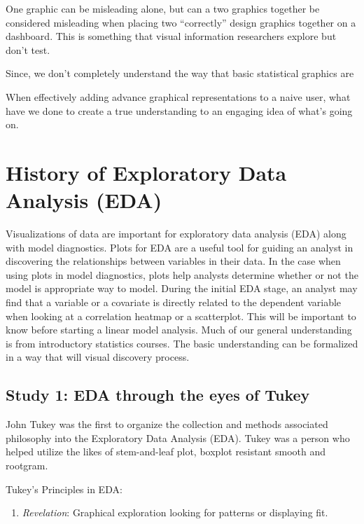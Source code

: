 \documentclass[print]{nuthesis}
\providecommand{\tightlist}{%
  \setlength{\itemsep}{0pt}\setlength{\parskip}{0pt}}
\begin{document}
One graphic can be misleading alone, but can a two graphics together be considered misleading when placing two ``correctly'' design graphics together on a dashboard. This is something that visual information researchers explore but don't test.

Since, we don't completely understand the way that basic statistical graphics are

When effectively adding advance graphical representations to a naive user, what have we done to create a true understanding to an engaging idea of what's going on.

\hypertarget{history-of-exploratory-data-analysis-eda}{%
\section{History of Exploratory Data Analysis (EDA)}\label{history-of-exploratory-data-analysis-eda}}

Visualizations of data are important for exploratory data analysis (EDA) along with model diagnostics. Plots for EDA are a useful tool for guiding an analyst in discovering the relationships between variables in their data. In the case when using plots in model diagnostics, plots help analysts determine whether or not the model is appropriate way to model. During the initial EDA stage, an analyst may find that a variable or a covariate is directly related to the dependent variable when looking at a correlation heatmap or a scatterplot. This will be important to know before starting a linear model analysis. Much of our general understanding is from introductory statistics courses. The basic understanding can be formalized in a way that will visual discovery process.

\hypertarget{study-1-eda-through-the-eyes-of-tukey}{%
\subsection{Study 1: EDA through the eyes of Tukey}\label{study-1-eda-through-the-eyes-of-tukey}}

John Tukey was the first to organize the collection and methods associated philosophy into the Exploratory Data Analysis (EDA). Tukey was a person who helped utilize the likes of stem-and-leaf plot, boxplot resistant smooth and rootgram.

Tukey's Principles in EDA:

\begin{enumerate}
\def\labelenumi{\arabic{enumi}.}
\tightlist
\item
  \emph{Revelation}: Graphical exploration looking for patterns or displaying fit.
\end{enumerate}
\end{document}
